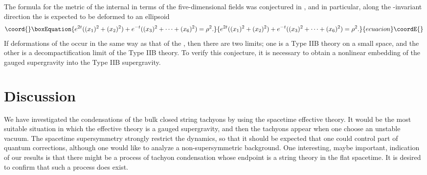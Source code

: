 \documentclass[a4paper,a4paper]{article}
\begin{document}
The formula for the metric of the internal \coordHE{} in terms of the five-dimensional fields was conjectured in 
\cite{critical3}, 
and in particular, along the \coordHE{}-invariant direction the \coordHE{} is expected to be deformed 
to an ellipsoid
\begin{equation}\coord{}\boxEquation{
e^{2t}((x_1)^2+(x_2)^2)+e^{-t}((x_3)^2+\cdots+(x_6)^2)=\rho^2.
}{
e^{2t}((x_1)^2+(x_2)^2)+e^{-t}((x_3)^2+\cdots+(x_6)^2)=\rho^2.
}{ecuacion}\coordE{}\end{equation}
If deformations of the \coordHE{} occur in the same way as that of the \coordHE{}, then there are two limits; one is a 
Type IIB theory on a small space, and the other is a decompactification limit of the Type IIB theory. 
To verify this conjecture, it is necessary to obtain a nonlinear embedding of the gauged supergravity into the 
Type IIB supergravity. 





















\vspace{1cm}

\section{Discussion} \label{discussion}

\vspace{5mm}

We have investigated the condensations of the bulk closed string tachyons by using the spacetime effective 
theory. 
It would be the most suitable situation in which the effective theory is a gauged supergravity, and then the 
tachyons appear when one choose an unstable vacuum. 
The spacetime supersymmetry strongly restrict the dynamics, so that it should be expected that one could control 
part of quantum corrections, although one would like to analyze a non-supersymmetric background. 
One interesting, maybe important, indication of our results is that there might be a process of tachyon 
condensation whose endpoint is a string theory in the flat spacetime. 
It is desired to confirm that such a process does exist. 
\end{document}
